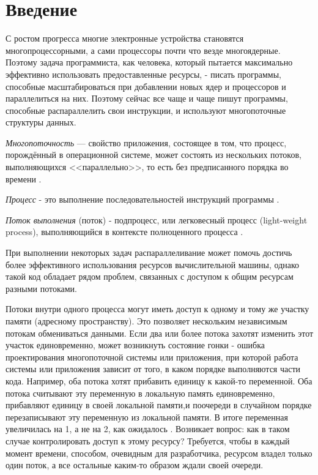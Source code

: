 \documentclass[12pt]{article}
\begin{document}
	\newpage
	
	{\pagestyle{plain}
		
		\section{Введение}
			\par \large С ростом прогресса многие электронные устройства становятся многопроцессорными, а сами процессоры почти что везде многоядерные. Поэтому задача программиста, как человека, который пытается максимально эффективно использовать предоставленные ресурсы, - писать программы, способные масштабироваться при добавлении новых ядер и процессоров и параллелиться на них. Поэтому сейчас все чаще и чаще пишут программы, способные распараллелить свои инструкции, и используют многопоточные структуры данных. 
			\par \textit{Многопоточность} — свойство приложения, состоящее в том, что процесс, порождённый в операционной системе, может состоять из нескольких потоков, выполняющихся <<параллельно>>, то есть без предписанного порядка во времени \cite{Tanenb}. 
			\par \textit{Процесс} - это выполнение последовательностей инструкций программы \cite{Tanenb}. 
			\par \textit{Поток выполнения} (поток) - подпроцесс, или легковесный процесс (light-weight process), выполняющийся в контексте полноценного процесса \cite{Tanenb}.
			\par При выполнении некоторых задач распараллеливание может помочь достичь более эффективного использования ресурсов вычислительной машины, однако такой код обладает рядом проблем, связанных с доступом к общим ресурсам разными потоками.
			\par Потоки внутри одного процесса могут иметь доступ к одному и тому же участку памяти (адресному пространству). Это позволяет нескольким независимым потокам обмениваться данными. Если два или более потока захотят изменить этот участок единовременно, может возникнуть состояние гонки - ошибка проектирования многопоточной системы или приложения, при которой работа системы или приложения зависит от того, в каком порядке выполняются части кода. Например, оба потока хотят прибавить единицу к какой-то переменной. Оба потока считывают эту переменную в локальную память единовременно, прибавляют единицу в своей локальной памяти,и поочереди в случайном порядке перезаписывают эту переменную из локальной памяти. В итоге переменная увеличилась на 1, а не на 2, как ожидалось \cite{wikiRace}. Возникает вопрос: как в таком случае контролировать доступ к этому ресурсу? Требуется, чтобы в каждый момент времени, способом, очевидным для разработчика, ресурсом владел только один поток, а все остальные каким-то образом ждали своей очереди. 
}
\end{document}
